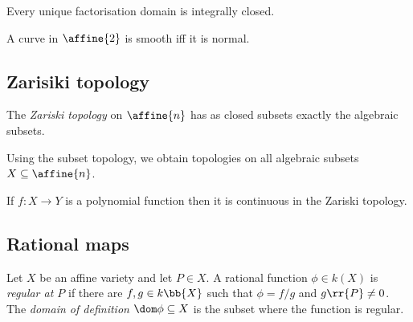 \documentclass{article}
\begin{document}
\begin{proposition}
  Every unique factorisation domain is integrally closed.
\end{proposition}

\begin{theorem}[Zariski]
  A curve in $\affine{2}$ is smooth iff it is normal.
\end{theorem}

\subsection{Zarisiki topology}

\begin{definition}
  The \emph{Zariski topology} on $\affine{n}$ has as closed subsets exactly the algebraic
  subsets.

  Using the subset topology, we obtain topologies on all algebraic subsets $X\subseteq \affine{n}$.
\end{definition}

\begin{proposition}
  If $f:X\to Y$ is a polynomial function then it is continuous in the Zariski topology.
\end{proposition}

\subsection{Rational maps}

\begin{definition}
  Let $X$ be an affine variety and let $P\in X$. A rational function $\phi\in k(X)$ is
  \emph{regular at $P$} if there are $f,g\in k\bb{X}$ such that $\phi = f/g$ and $g\rr{P}\neq 0$.
  The \emph{domain of definition} $\dom\phi\subseteq X$ is the subset where the function
  is regular.
\end{definition}
\end{document}
